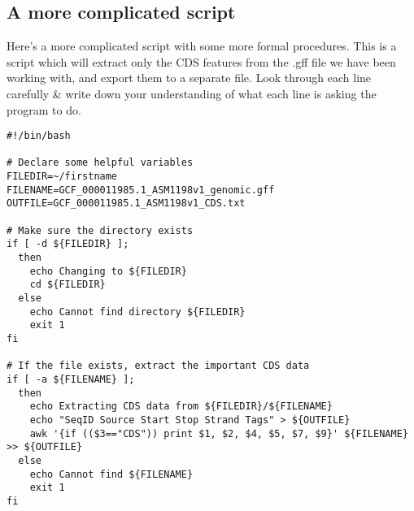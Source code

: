%
%
%

\clearpage
\subsection*{A more complicated script}

Here's a more complicated script with some more formal procedures.
This is a script which will extract only the CDS features from the .gff file we have been working with, and export them to a separate file.
Look through each line carefully \& write down your understanding of what each line is asking the program to do.

\begin{lstlisting}[style=command_syntax]
#!/bin/bash

# Declare some helpful variables
FILEDIR=~/firstname
FILENAME=GCF_000011985.1_ASM1198v1_genomic.gff
OUTFILE=GCF_000011985.1_ASM1198v1_CDS.txt

# Make sure the directory exists
if [ -d ${FILEDIR} ];
  then
    echo Changing to ${FILEDIR}
    cd ${FILEDIR}
  else
    echo Cannot find directory ${FILEDIR}
    exit 1
fi

# If the file exists, extract the important CDS data
if [ -a ${FILENAME} ];
  then
    echo Extracting CDS data from ${FILEDIR}/${FILENAME}
    echo "SeqID Source Start Stop Strand Tags" > ${OUTFILE}
    awk '{if (($3=="CDS")) print $1, $2, $4, $5, $7, $9}' ${FILENAME} >> ${OUTFILE}
  else
    echo Cannot find ${FILENAME}
    exit 1
fi
\end{lstlisting}

